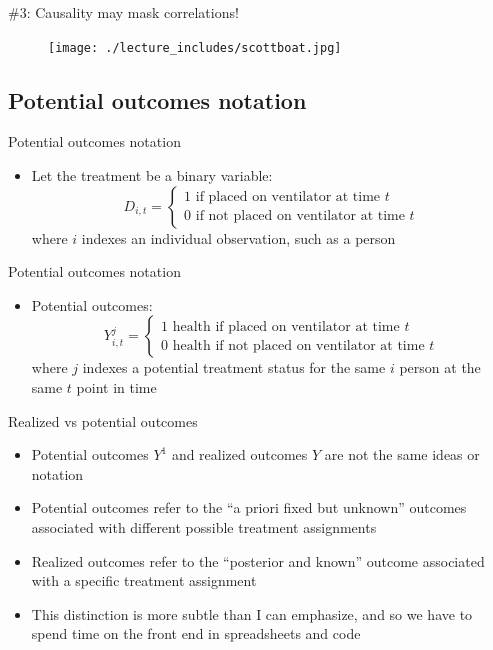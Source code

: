 \documentclass{beamer}
\begin{document}
\begin{frame}{\#3: Causality may mask correlations!}

  \begin{figure}
    \centering
    \texttt{[image: ./lecture\_includes/scottboat.jpg]}
  \end{figure}

\end{frame}


\subsection{Potential outcomes notation}





\begin{frame}{Potential outcomes notation}

  \begin{itemize}
    \item Let the treatment be a binary variable: $$D_{i,t} =\begin{cases} 1 \text{ if placed on ventilator at time $t$} \\ 0 \text{ if not placed on ventilator at time $t$} \end{cases}$$where $i$ indexes an individual observation, such as a person
  \end{itemize}
\end{frame}

\begin{frame}{Potential outcomes notation}

  \begin{itemize}
    \item Potential outcomes: $$Y_{i,t}^j =\begin{cases} 1 \text{ health if placed on ventilator at time $t$} \\ 0 \text{ health if not placed on ventilator at time $t$} \end{cases}$$where $j$ indexes a potential treatment status for the same $i$ person at the same $t$ point in time
  \end{itemize}
\end{frame}


\begin{frame}{Realized vs potential outcomes}

  \begin{itemize}
    \item Potential outcomes $Y^1$ and realized outcomes $Y$ are not the same ideas or notation
    \item Potential outcomes refer to the ``a priori fixed but unknown'' outcomes associated with different possible treatment assignments
    \item Realized outcomes refer to the ``posterior and known'' outcome associated with a specific treatment assignment
    \item This distinction is more subtle than I can emphasize, and so we have to spend time on the front end in spreadsheets and code
  \end{itemize}
\end{frame}
\end{document}
